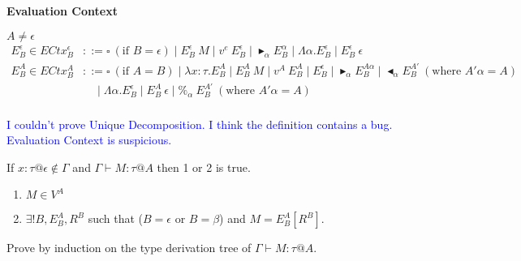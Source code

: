 \documentclass[9pt, a4paper]{extarticle}
\theoremstyle{break}
\newcommand{\figheader}[2]{
  \begin{flushleft}
    #2 {\bf \normalsize #1}
\end{flushleft}}
\newcommand{\G}{\Gamma}
\newcommand{\V}{\vdash}
\newcommand{\TB}{\blacktriangleright}
\newcommand{\TBL}{\blacktriangleleft}
\newcommand{\blue}[1]{\textcolor{blue}{ #1 }}
\begin{document}
\figheader{Evaluation Context}{}
$A \neq \epsilon$\\
\begin{align*}
    E^\epsilon_B \in ECtx^\epsilon_B & ::= \square\ (\text{if\ } B = \epsilon) \mid E^\epsilon_B\ M \mid v^e\ E^\epsilon_B
                                           \mid \TB_\alpha E^\alpha_B \mid \Lambda\alpha.E^\epsilon_B
                                           \mid E^\epsilon_B\ \epsilon  \\
    E^A_B \in ECtx^A_B & ::= \square\ (\text{if } A = B) \mid \lambda x:\tau.E^A_B \mid E^A_B\ M \mid v^A\ E^A_B
                                           \mid E^\epsilon_B \mid \TB_\alpha E^{A\alpha}_B
                                           \mid \TBL_\alpha E^{A'}_B \ (\text{where } A'\alpha = A) \\
                                           & \quad \mid \Lambda\alpha.E^\epsilon_B
                                           \mid E^A_B\ \epsilon \mid \%_\alpha\ E^{A'}_B \ (\text{where } A'\alpha = A)\\
\end{align*}

\blue{I couldn't prove Unique Decomposition. I think the definition contains a bug. Evaluation Context is suspicious.}

\begin{thm}
    If $x:\tau@\epsilon \notin \G$ and $\G \V M : \tau @ A$ then 1 or 2 is true.
    \begin{enumerate}
        \item $ M \in V^A$
        \item $\exists ! B, E^A_B, R^B$ such that ($B = \epsilon$ or $B = \beta$) and $M = E^A_B[R^B]$.
    \end{enumerate}
\end{thm}

Prove by induction on the type derivation tree of $\G \V M:\tau@A$.
\end{document}
